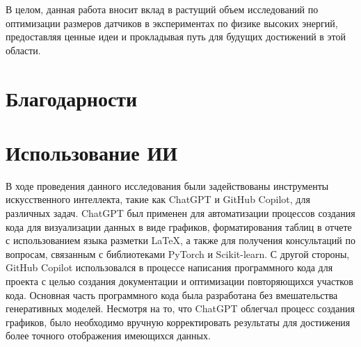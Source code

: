 \documentclass[a4paper,12pt]{extarticle}
\begin{document}
В целом, данная работа вносит вклад в растущий объем исследований по оптимизации размеров датчиков в экспериментах по физике высоких энергий, предоставляя ценные идеи и прокладывая путь для будущих достижений в этой области.

\section{Благодарности}

\section{Использование ИИ}

В ходе проведения данного исследования были задействованы инструменты искусственного интеллекта, такие как ChatGPT и GitHub Copilot, для различных задач. ChatGPT был применен для автоматизации процессов создания кода для визуализации данных в виде графиков, форматирования таблиц в отчете с использованием языка разметки LaTeX, а также для получения консультаций по вопросам, связанным с библиотеками PyTorch и Scikit-learn. С другой стороны, GitHub Copilot использовался в процессе написания программного кода для проекта с целью создания документации и оптимизации повторяющихся участков кода. Основная часть программного кода была разработана без вмешательства генеративных моделей. Несмотря на то, что ChatGPT облегчал процесс создания графиков, было необходимо вручную корректировать результаты для достижения более точного отображения имеющихся данных.

\newpage 
\printbibliography[heading=bibintoc] 


\newpage
\appendix

\end{document}
